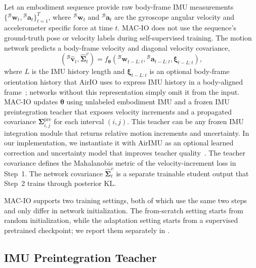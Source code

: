 Let an embodiment sequence provide raw body-frame IMU measurements $\{{}^\mathcal{B}\mathbf{w}_t,{}^\mathcal{B}\mathbf{a}_t\}_{t=1}^{T}$, where ${}^\mathcal{B}\mathbf{w}_t$ and ${}^\mathcal{B}\mathbf{a}_t$ are the gyroscope angular velocity and accelerometer specific force at time $t$.
MAC-IO does not use the sequence's ground-truth pose or velocity labels during self-supervised training.
The motion network predicts a body-frame velocity and diagonal velocity covariance,
\begin{equation}
({}^\mathcal{B}\hat{\mathbf{v}}_t,\hat{\boldsymbol{\Sigma}}^v_t)=f_{\boldsymbol{\theta}}({}^\mathcal{B}\mathbf{w}_{t-L:t},{}^\mathcal{B}\mathbf{a}_{t-L:t},\boldsymbol{\xi}_{t-L:t}),
\end{equation}
where $L$ is the IMU history length and $\boldsymbol{\xi}_{t-L:t}$ is an optional body-frame orientation history that AirIO uses to express IMU history in a body-aligned frame~\cite{qiu2025airio}; networks without this representation simply omit it from the input.
MAC-IO updates $\boldsymbol{\theta}$ using unlabeled embodiment IMU and a frozen IMU preintegration teacher that exposes velocity increments and a propagated covariance $\boldsymbol{\Sigma}^{\mathrm{pre}}_{i,j}$ for each interval $(i,j)$.
This teacher can be any frozen IMU integration module that returns relative motion increments and uncertainty.
In our implementation, we instantiate it with AirIMU as an optional learned correction and uncertainty model that improves teacher quality~\cite{qiu2023airimu}.
The teacher covariance defines the Mahalanobis metric of the velocity-increment loss in Step~1.
The network covariance $\hat{\boldsymbol{\Sigma}}^v_t$ is a separate trainable student output that Step~2 trains through posterior KL.

MAC-IO supports two training settings, both of which use the same two steps and only differ in network initialization.
The from-scratch setting starts from random initialization, while the adaptation setting starts from a supervised pretrained checkpoint; we report them separately in .

\subsection{IMU Preintegration Teacher}
\label{sec:macio:teacher}

